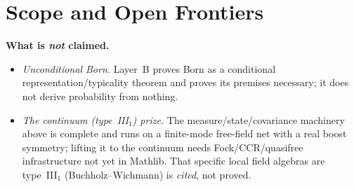 \chapter{Scope and Open Frontiers}

\noindent\textbf{What is \emph{not} claimed.}
\begin{itemize}
  \item \emph{Unconditional Born.} Layer~B proves Born as a conditional
        representation/typicality theorem and proves its premises necessary; it does
        not derive probability from nothing.
  \item \emph{The continuum (type~III$_1$) prize.} The measure/state/covariance
        machinery above is complete and runs on a finite-mode free-field net with a
        real boost symmetry; lifting it to the continuum needs Fock/CCR/quasifree
        infrastructure not yet in Mathlib. That specific local field algebras are
        type~III$_1$ (Buchholz--Wichmann) is \emph{cited}, not proved.
\end{itemize}
